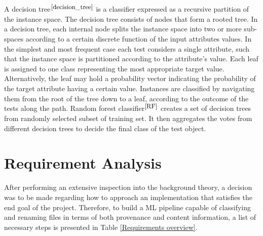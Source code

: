 A decision tree$^{\small \cite{decision_tree}}$ is a classifier expressed as a recursive partition of the instance space. The decision tree consists of nodes that form a rooted tree. In a decision tree, each internal node splits the instance space into two or more sub-spaces according to a certain discrete function of the input attributes values. In the simplest and most frequent case each test considers a single attribute, such that the instance space is partitioned according to the attribute’s value. Each leaf is assigned to one class representing the most appropriate target value. Alternatively, the leaf may hold a probability vector indicating the probability of the target attribute having a certain value. Instances are classified by navigating them from the root of the tree down to a leaf, according to the outcome of the tests along the path. Random forest classifier$^{\small \cite{RF}}$ creates a set of decision trees from randomly selected subset of training set. It then aggregates the votes from different decision trees to decide the final class of the test object. 

\section{Requirement Analysis} \label{Requirement Analysis}

After performing an extensive inspection into the background theory, a decision was to be made regarding how to approach an implementation that satisfies the end goal of the project. Therefore, to build a ML pipeline capable of classifying and renaming files in terms of both provenance and content information, a list of necessary steps is presented in Table \ref{Requirements overview}. \newpage

